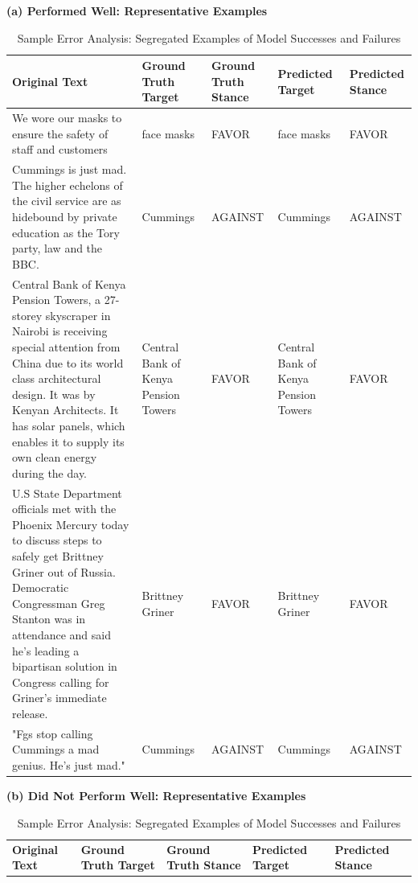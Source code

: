 \documentclass[twocolumn,11pt,letterpaper]{article}
\begin{document}
\begin{table}[!htbp]
    \centering
    \caption{Sample Error Analysis: Segregated Examples of Model Successes and Failures}
    \label{tab:error_analysis_examples}
    \begin{minipage}{0.98\textwidth}
    \centering
    \textbf{(a) Performed Well: Representative Examples}
    \vspace{0.5em}
    \begin{tabular}{|p{}|p{}|p{}|p{}|p{}|}
    \hline
    \textbf{Original Text} & \textbf{Ground Truth Target} & \textbf{Ground Truth Stance} & \textbf{Predicted Target} & \textbf{Predicted Stance} \\
    \hline
    We wore our masks to ensure the safety of staff and customers & face masks & FAVOR & face masks & FAVOR \\
    \hline
    Cummings is just mad. The higher echelons of the civil service are as hidebound by private education as the Tory party, law and the BBC. & Cummings & AGAINST & Cummings & AGAINST \\
    \hline
    Central Bank of Kenya Pension Towers, a 27-storey skyscraper in Nairobi is receiving special attention from China due to its world class architectural design. It was by Kenyan Architects. It has solar panels, which enables it to supply its own clean energy during the day. & Central Bank of Kenya Pension Towers & FAVOR & Central Bank of Kenya Pension Towers & FAVOR \\
    \hline
    U.S State Department officials met with the Phoenix Mercury today to discuss steps to safely get Brittney Griner out of Russia. Democratic Congressman Greg Stanton was in attendance and said he's leading a bipartisan solution in Congress calling for Griner's immediate release. & Brittney Griner & FAVOR & Brittney Griner & FAVOR \\
    \hline
    "Fgs stop calling Cummings a mad genius. He's just mad." & Cummings & AGAINST & Cummings & AGAINST \\
    \hline
    \end{tabular}
    \vspace{1em}
    \textbf{(b) Did Not Perform Well: Representative Examples}
    \vspace{0.5em}
    \begin{tabular}{|p{}|p{}|p{}|p{}|p{}|}
    \hline
    \textbf{Original Text} & \textbf{Ground Truth Target} & \textbf{Ground Truth Stance} & \textbf{Predicted Target} & \textbf{Predicted Stance} \\

\end{tabular}
\end{minipage}
\end{table}
\end{document}
